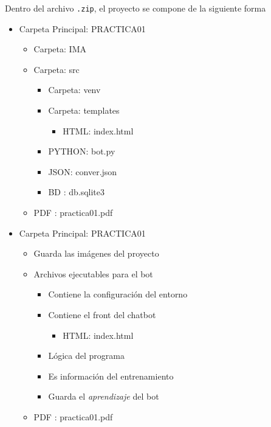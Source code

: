 \documentclass[a4paper,12pt]{article}
\begin{document}
Dentro del archivo \texttt{.zip}, el proyecto se compone de la siguiente forma\\

\begin{minipage}[t]{6.8cm}
\begin{itemize}
    \item Carpeta Principal: PRACTICA01
    \begin{itemize}
        \item Carpeta: IMA
        \item Carpeta: src
        \begin{itemize}
            \item Carpeta: venv
            \item Carpeta: templates            
            \begin{itemize}
                \item HTML: index.html
            \end{itemize}
            \item PYTHON: bot.py
            \item JSON: conver.json
            \item BD : db.sqlite3
        \end{itemize}
        \item PDF : practica01.pdf
    \end{itemize}
\end{itemize}
\end{minipage}
\hspace{2mm}
\begin{minipage}[t]{9cm}
    \begin{itemize}
        \item[] Carpeta Principal: PRACTICA01
        \begin{itemize}
            \item[] Guarda las imágenes del proyecto 
            \item[] Archivos ejecutables para el bot
            \begin{itemize}
                \item[] Contiene la configuración del entorno
                \item[] Contiene el front del chatbot            
                \begin{itemize}
                    \item[] HTML: index.html
                \end{itemize}
                \item[] Lógica del programa
                \item[] Es información del entrenamiento
                \item[] Guarda el \textit{aprendizaje} del bot 
            \end{itemize}
            \item[] PDF : practica01.pdf
        \end{itemize}
    \end{itemize}
\end{minipage}
\end{document}
